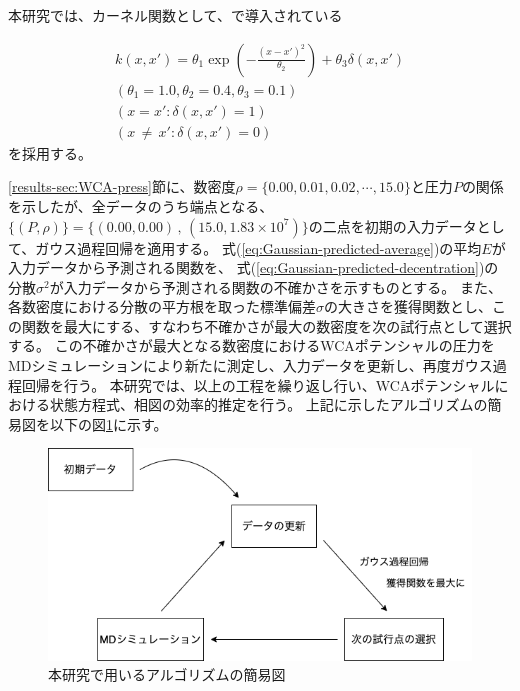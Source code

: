 \documentclass[titlepage]{jsreport}
\begin{document}
{{{本研究では、カーネル関数として、\cite{Gauss-machine-learning}で導入されている

\large
\begin{eqnarray}
    k(x,x')=\theta_1\exp\left(-\frac{(x-x')^2}{\theta_2}\right)+\theta_3\delta(x,x')\\ \label{eq:Gauss-kernel}
    (\theta_1=1.0,\theta_2=0.4,\theta_3=0.1) \nonumber \\ 
    (x=x':\delta(x,x')=1) \nonumber \\
    (x\,{\neq}\,x':\delta(x,x')=0) \nonumber
\end{eqnarray}
\normalsize
を採用する。

\ref{results-sec:WCA-press}節に、数密度$\rho=\{0.00,0.01,0.02,\cdots,15.0\}$と圧力$P$の関係を示したが、全データのうち端点となる、
$\{(P,\rho)\}=\{(0.00,0.00)\,,\,(15.0,1.83×10^7)\}$の二点を初期の入力データとして、ガウス過程回帰を適用する。
式(\ref{eq:Gaussian-predicted-average})の平均$E$が入力データから予測される関数を、
式(\ref{eq:Gaussian-predicted-decentration})の分散$\sigma^2$が入力データから予測される関数の不確かさを示すものとする。
また、各数密度における分散の平方根を取った標準偏差$\sigma$の大きさを獲得関数とし、この関数を最大にする、すなわち不確かさが最大の数密度を次の試行点として選択する。
この不確かさが最大となる数密度におけるWCAポテンシャルの圧力をMDシミュレーションにより新たに測定し、入力データを更新し、再度ガウス過程回帰を行う。
本研究では、以上の工程を繰り返し行い、WCAポテンシャルにおける状態方程式、相図の効率的推定を行う。
上記に示したアルゴリズムの簡易図を以下の図\ref{fig:algorithm}に示す。

\begin{figure}[htbp]
    \begin{center}
        \includegraphics[width=14cm]{fig/algorithm.png}
    \end{center}
    \caption{本研究で用いるアルゴリズムの簡易図}
    \label{fig:algorithm}
\end{figure}

}}}
\end{document}
